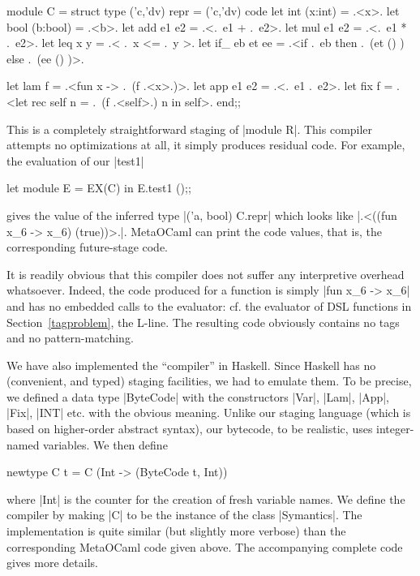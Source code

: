\documentclass[preprint]{sigplanconf}
\newcommand{\oleg}[1]{{\it [Oleg says: #1]}}
\begin{document}
\begin{code}
module C = struct
  type ('c,'dv) repr = ('c,'dv) code
  let int (x:int) = .<x>.
  let bool (b:bool) = .<b>.
  let add e1 e2 = .<.~e1 + .~e2>.
  let mul e1 e2 = .<.~e1 * .~e2>.
  let leq x y = .< .~x <= .~y >.
  let if_ eb et ee = 
    .<if .~eb then .~(et () ) else .~(ee () )>.

  let lam f = .<fun x -> .~(f .<x>.)>.
  let app e1 e2 = .<.~e1 .~e2>.
  let fix f = 
     .<let rec self n = .~(f .<self>.) n in self>.
end;;
\end{code}
This is a completely straightforward staging of
|module R|.
This compiler attempts no optimizations at all, it simply produces
residual code. For example, the evaluation of our |test1|
\begin{code}
  let module E = EX(C) in E.test1 ();;
\end{code}
gives the value of the inferred type |('a, bool) C.repr| which looks
like |.<((fun x_6 -> x_6) (true))>.|. MetaOCaml can print the code
values, that is, the corresponding future-stage code.

\begin{comment}
\oleg{one may wish to give the folloiwng example too; the code
  expression can be somewhat abbreviated...}
\begin{code}
  let module E = EX(C) in E.testpowfix7;;
# - : ('_a, int -> int) C.repr =
.<fun x_1 ->
   (((fun x_2 ->
       let rec self_3 =
        fun n_4 ->
         ((fun x_5 -> if (x_5 <= 0) then 1 else (x_2 * (self_3 (x_5 + (-1)))))
           n_4) in
       self_3) x_1) 7)>.
\end{code}
\end{comment}

\noindent It is readily obvious that this compiler does not suffer
any interpretive overhead whatsoever. Indeed, the
  code produced for a function is simply |fun x_6 -> x_6| and has no 
  embedded calls to the evaluator: cf. the evaluator of DSL functions
  in Section~\ref{tagproblem}, the L-line.
The resulting code obviously contains no tags and no pattern-matching.

We have also implemented the ``compiler'' in Haskell. Since Haskell
has no (convenient, and typed) staging facilities, we had to emulate
them. To be precise, we defined a data type |ByteCode| with the
constructors |Var|, |Lam|, |App|, |Fix|, |INT| etc. with the obvious
meaning. Unlike our staging language (which is based on higher-order
abstract syntax), our bytecode, to be realistic, uses integer-named
variables. We then define 
\begin{code}
  newtype C t = C (Int -> (ByteCode t, Int)) 
\end{code}
where |Int| is the counter for the creation of fresh variable
names. We define the compiler by making |C| to be the instance of the
class |Symantics|. The implementation is quite similar (but slightly more
verbose) than the corresponding MetaOCaml code given above. The
accompanying complete code gives more details.
\end{document}
